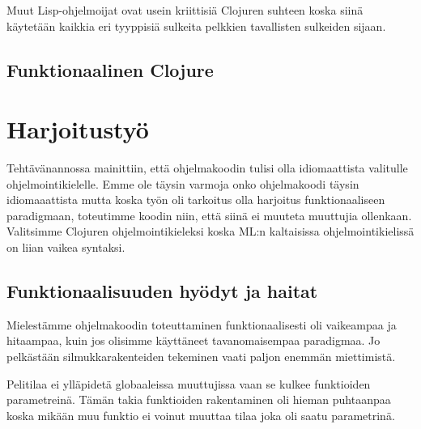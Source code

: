 \documentclass[12pt]{article}
\begin{document}
Muut Lisp-ohjelmoijat ovat usein kriittisiä Clojuren suhteen koska siinä käytetään kaikkia eri tyyppisiä sulkeita pelkkien tavallisten sulkeiden sijaan.
\subsection{Funktionaalinen Clojure}

\section{Harjoitustyö}
Tehtävänannossa mainittiin, että ohjelmakoodin tulisi olla idiomaattista valitulle ohjelmointikielelle.
Emme ole täysin varmoja onko ohjelmakoodi täysin idiomaaattista mutta koska työn oli tarkoitus olla harjoitus funktionaaliseen paradigmaan,
toteutimme koodin niin, että siinä ei muuteta muuttujia ollenkaan.
Valitsimme Clojuren ohjelmointikieleksi koska ML:n kaltaisissa ohjelmointikielissä on liian vaikea syntaksi.

\subsection{Funktionaalisuuden hyödyt ja haitat}
Mielestämme ohjelmakoodin toteuttaminen funktionaalisesti oli vaikeampaa ja hitaampaa, kuin jos olisimme käyttäneet tavanomaisempaa
paradigmaa. Jo pelkästään silmukkarakenteiden tekeminen vaati paljon enemmän miettimistä. 


Pelitilaa ei ylläpidetä globaaleissa muuttujissa vaan se kulkee funktioiden parametreinä.
Tämän takia funktioiden rakentaminen oli hieman puhtaanpaa koska mikään muu funktio ei voinut muuttaa tilaa joka oli saatu parametrinä.






\end{document}
